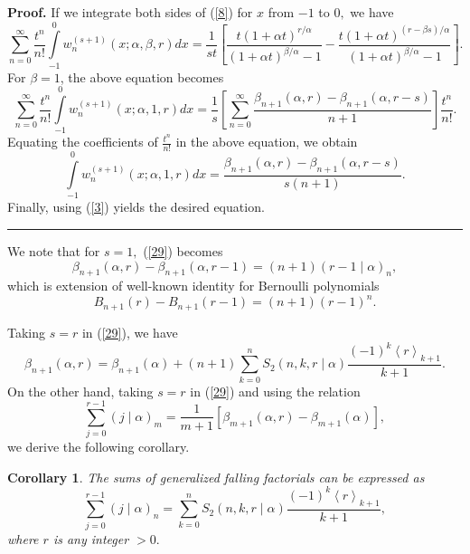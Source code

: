 \documentclass{article}%
\newtheorem{corollary}[theorem]{Corollary}
\newenvironment{proof}[1][Proof]{\noindent\textbf{#1.} }{\ \rule{0.5em}{0.5em}}
\begin{document}
\begin{proof}
If we integrate both sides of (\ref{8}) for $x$ from $-1$ to $0,$ we have%
\begin{equation}
\sum_{n=0}^{\infty}\frac{t^{n}}{n!}%
{\displaystyle\int\limits_{-1}^{0}}
w_{n}^{\left(  s+1\right)  }\left(  x;\alpha,\beta,r\right)  dx=\frac{1}%
{st}\left[  \frac{t\left(  1+\alpha t\right)  ^{r/\alpha}}{\left(  1+\alpha
t\right)  ^{\beta/\alpha}-1}-\frac{t\left(  1+\alpha t\right)  ^{\left(
r-\beta s\right)  /\alpha}}{\left(  1+\alpha t\right)  ^{\beta/\alpha}%
-1}\right]  . \label{13}%
\end{equation}
For $\beta=1$, the above equation becomes%
\[
\sum_{n=0}^{\infty}\frac{t^{n}}{n!}%
{\displaystyle\int\limits_{-1}^{0}}
w_{n}^{\left(  s+1\right)  }\left(  x;\alpha,1,r\right)  dx=\frac{1}{s}\left[
\sum_{n=0}^{\infty}\frac{\beta_{n+1}\left(  \alpha,r\right)  -\beta
_{n+1}\left(  \alpha,r-s\right)  }{n+1}\right]  \frac{t^{n}}{n!}.
\]
Equating the coefficients of $\frac{t^{n}}{n!}$ in the above equation, we
obtain%
\[%
{\displaystyle\int\limits_{-1}^{0}}
w_{n}^{\left(  s+1\right)  }\left(  x;\alpha,1,r\right)  dx=\frac{\beta
_{n+1}\left(  \alpha,r\right)  -\beta_{n+1}\left(  \alpha,r-s\right)
}{s\left(  n+1\right)  }.
\]
Finally, using (\ref{3}) yields the desired equation.
\end{proof}

We note that for $s=1,$ (\ref{29}) becomes
\[
\beta_{n+1}\left(  \alpha,r\right)  -\beta_{n+1}\left(  \alpha,r-1\right)
=\left(  n+1\right)  \left(  r-1\mid\alpha\right)  _{n},
\]
which is extension of well-known identity for Bernoulli polynomials%
\[
B_{n+1}\left(  r\right)  -B_{n+1}\left(  r-1\right)  =\left(  n+1\right)
\left(  r-1\right)  ^{n}.
\]


Taking $s=r$ in (\ref{29}), we have
\[
\beta_{n+1}\left(  \alpha,r\right)  =\beta_{n+1}\left(  \alpha\right)
+\left(  n+1\right)  \sum_{k=0}^{n}S_{2}\left(  n,k,r\mid\alpha\right)
\frac{\left(  -1\right)  ^{k}\left\langle r\right\rangle _{k+1}}{k+1}.
\]
On the other hand, taking $s=r$ in (\ref{29}) and using the relation \cite[Eq.
(5.4)]{Carlitz}%
\[
\sum_{j=0}^{r-1}\left(  j\mid\alpha\right)  _{m}=\frac{1}{m+1}\left[
\beta_{m+1}\left(  \alpha,r\right)  -\beta_{m+1}\left(  \alpha\right)
\right]  ,
\]
we derive the following corollary.

\begin{corollary}
The sums of generalized falling factorials can be expressed as%
\[
\sum_{j=0}^{r-1}\left(  j\mid\alpha\right)  _{n}=\sum_{k=0}^{n}S_{2}\left(
n,k,r\mid\alpha\right)  \frac{\left(  -1\right)  ^{k}\left\langle
r\right\rangle _{k+1}}{k+1},
\]
where $r$ is any integer $>0.$
\end{corollary}
\end{document}
